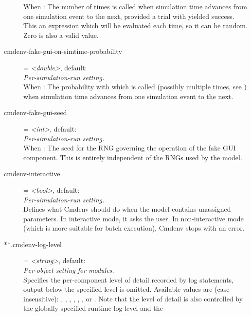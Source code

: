 \begin{description}
    When : The
    number of times  is called when simulation time
    advances from one simulation event to the next, provided a trial with
    yielded success. This an expression which will be evaluated each time, so
    it can be random. Zero is also a valid value.
\item[cmdenv-fake-gui-on-simtime-probability] = \textit{<double>}, default: \\
    \textit{Per-simulation-run setting.}\\
    When : The
    probability with which  is called (possibly
    multiple times, see
    )
    when simulation time advances from one simulation event to the next.
\item[cmdenv-fake-gui-seed] = \textit{<int>}, default: \\
    \textit{Per-simulation-run setting.}\\
    When : The
    seed for the RNG governing the operation of the fake GUI component. This is
    entirely independent of the RNGs used by the model.
\item[cmdenv-interactive] = \textit{<bool>}, default: \\
    \textit{Per-simulation-run setting.}\\
    Defines what Cmdenv should do when the model contains unassigned
    parameters. In interactive mode, it asks the user. In non-interactive mode
    (which is more suitable for batch execution), Cmdenv stops with an error.
\item[**.cmdenv-log-level] = \textit{<string>}, default: \\
    \textit{Per-object setting for modules.}\\
    Specifies the per-component level of detail recorded by log statements,
    output below the specified level is omitted. Available values are (case
    insensitive): , , , , ,
    ,  or . Note that the level of detail is
    also controlled by the globally specified runtime log level and the

\end{description}
